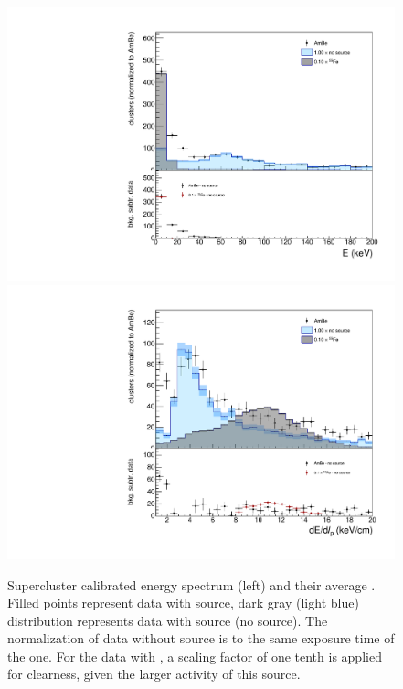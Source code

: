 \begin{figure}[ht]
  \begin{center}
  \includegraphics[width=0.45\linewidth]{figures/energyExt}
  \includegraphics[width=0.45\linewidth]{figures/dedx}

  \caption{Supercluster calibrated energy spectrum (left) and their
    average \dedl. Filled points represent data with \ambe source,
    dark gray (light blue) distribution represents data with \fe
    source (no source).  The normalization of data without source is
    to the same exposure time of the \ambe one. For the data with \fe,
    a scaling factor of one tenth is applied for clearness, given the
    larger activity of this source. \label{fig:energy}}

\end{center}
\end{figure}

